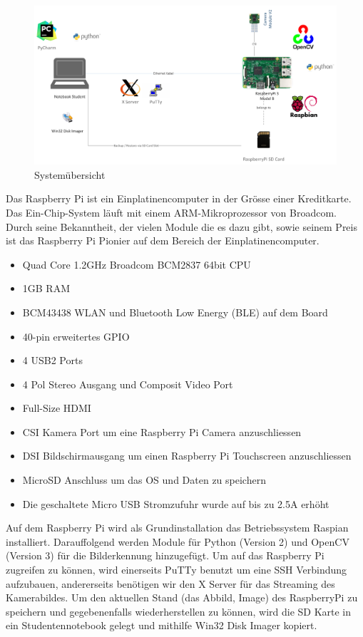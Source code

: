 \documentclass[a4paper]{report}
\begin{document}
\begin{figure}[h!]
	\includegraphics[keepaspectratio,width=\textwidth]{TargetRecOS}
	\caption{Systemübersicht}
	\label{fig:Systemuebersicht}
\end{figure}

Das Raspberry Pi ist ein Einplatinencomputer in der Grösse einer Kreditkarte. Das Ein-Chip-System läuft mit einem ARM-Mikroprozessor von Broadcom. Durch seine Bekanntheit, der vielen Module die es dazu gibt, sowie seinem Preis ist das Raspberry Pi Pionier auf dem Bereich der Einplatinencomputer.

\begin{itemize}[noitemsep]
	\item Quad Core 1.2GHz Broadcom BCM2837 64bit CPU
	\item 1GB RAM
	\item BCM43438 WLAN und Bluetooth Low Energy (BLE) auf dem Board
	\item 40-pin erweitertes GPIO
	\item 4 USB2 Ports
	\item 4 Pol Stereo Ausgang und Composit Video Port
	\item Full-Size HDMI
	\item CSI Kamera Port um eine Raspberry Pi Camera anzuschliessen
	\item DSI Bildschirmausgang um einen Raspberry Pi Touchscreen anzuschliessen
	\item MicroSD Anschluss um das OS und Daten zu speichern
	\item Die geschaltete Micro USB Stromzufuhr wurde auf bis zu 2.5A erhöht
\end{itemize}\parencite{RaspberryPiFoundation2017}

\vspace{1em}
Auf dem Raspberry Pi wird als Grundinstallation das Betriebssystem Raspian installiert. Darauffolgend werden Module für Python (Version 2) und OpenCV (Version 3) für die Bilderkennung hinzugefügt.
Um auf das Raspberry Pi zugreifen zu können, wird einerseits PuTTy benutzt um eine SSH Verbindung aufzubauen, andererseits benötigen wir den X Server für das Streaming des Kamerabildes.
Um den aktuellen Stand (das Abbild, Image) des RaspberryPi zu speichern und gegebenenfalls wiederherstellen zu können, wird die SD Karte in ein Studentennotebook gelegt und mithilfe Win32 Disk Imager kopiert.
\end{document}
